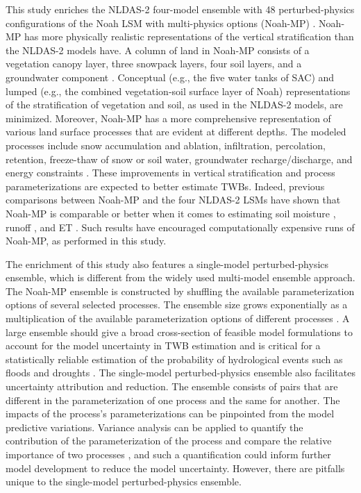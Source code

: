 \documentclass[essd, manuscript]{copernicus}
\begin{document}
This study enriches the NLDAS-2 four-model ensemble with 48 perturbed-physics configurations of the Noah LSM with multi-physics options (Noah-MP) \citep{niu2011JGRA, yang2011JGRA}. Noah-MP has more physically realistic representations of the vertical stratification than the NLDAS-2 models have. A column of land in Noah-MP consists of a vegetation canopy layer, three snowpack layers, four soil layers, and a groundwater component \citep{niu2011JGRA}. Conceptual (e.g., the five water tanks of SAC) and lumped (e.g., the combined vegetation-soil surface layer of Noah) representations of the stratification of vegetation and soil, as used in the NLDAS-2 models, are minimized. Moreover, Noah-MP has a more comprehensive representation of various land surface processes that are evident at different depths. The modeled processes include snow accumulation and ablation, infiltration, percolation, retention, freeze-thaw of snow or soil water, groundwater recharge/discharge, and energy constraints \citep{niu2011JGRA}. These improvements in vertical stratification and process parameterizations are expected to better estimate TWBs. Indeed, previous comparisons between Noah-MP and the four NLDAS-2 LSMs have shown that Noah-MP is comparable or better when it comes to estimating soil moisture \citep{cai2014JGRAa}, runoff \citep{cai2014JGRA, fei2021WRR}, and ET \citep{zhang2020AFM}. Such results have encouraged computationally expensive runs of Noah-MP, as performed in this study.

The enrichment of this study also features a single-model perturbed-physics ensemble, which is different from the widely used multi-model ensemble approach. The Noah-MP ensemble is constructed by shuffling the available parameterization options of several selected processes. The ensemble size grows exponentially as a multiplication of the available parameterization options of different processes \citep{yang2011JGRA, zhang2016JGRA, gan2019WRR}. A large ensemble should give a broad cross-section of feasible model formulations to account for the model uncertainty in TWB estimation \citep{telteu2021GMD, mitchell2004JGRA} and is critical for a statistically reliable estimation of the probability of hydrological events such as floods and droughts \citep{troin2021WRR}. The single-model perturbed-physics ensemble also facilitates uncertainty attribution and reduction. The ensemble consists of pairs that are different in the parameterization of one process and the same for another. The impacts of the process's parameterizations can be pinpointed from the model predictive variations. Variance analysis can be applied to quantify the contribution of the parameterization of the process and compare the relative importance of two processes \citep{zheng2019WRR, clark2011WRR}, and such a quantification could inform further model development to reduce the model uncertainty. However, there are pitfalls unique to the single-model perturbed-physics ensemble.
\end{document}
